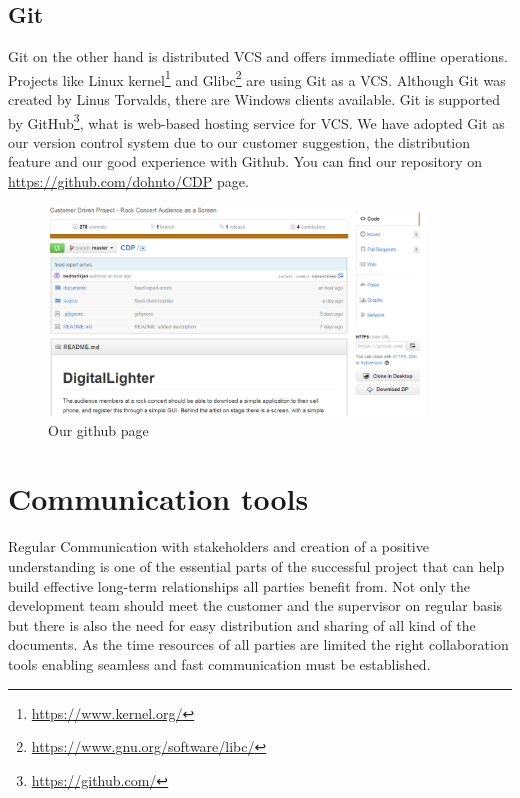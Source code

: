 
\subsection{Git}
Git on the other hand is distributed VCS and offers immediate offline operations.
Projects like Linux kernel\footnote{\url{https://www.kernel.org/}} and Glibc\footnote{\url{https://www.gnu.org/software/libc/}} are using Git as a VCS.
Although Git was created by Linus Torvalds, there are Windows clients available.
Git is supported by GitHub\footnote{\url{https://github.com/}}, what is web-based hosting service for VCS. We have adopted Git as our version control system due to our customer suggestion, the distribution feature and our good experience with Github.
You can find our repository on \url{https://github.com/dohnto/CDP} page.

\begin{figure}[!t]
	\centering
		\includegraphics[width=10cm]{preliminaryStudies/git.png}
	\caption{Our github page}
	\label{img:git}
\end{figure}



\section{Communication tools} \label{txt:communication tools}
Regular Communication with stakeholders and creation of a positive understanding is one of the essential parts of the successful project that can help build effective long-term relationships all parties benefit from. Not only the development team should meet the customer and the supervisor on regular basis but there is also the need for easy distribution and sharing of all kind of the documents. As the time resources of all parties are limited the right collaboration tools enabling seamless and fast communication must be established.

